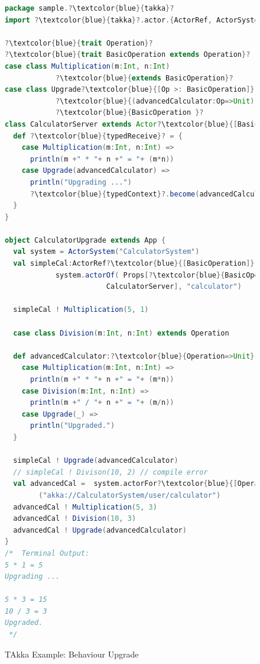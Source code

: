 \begin{figure}[!h]
\begin{lstlisting}[language=scala,  escapechar=?]
package sample.?\textcolor{blue}{takka}?
import ?\textcolor{blue}{takka}?.actor.{ActorRef, ActorSystem, Props, Actor}

?\textcolor{blue}{trait Operation}?
?\textcolor{blue}{trait BasicOperation extends Operation}?
case class Multiplication(m:Int, n:Int) 
			?\textcolor{blue}{extends BasicOperation}?
case class Upgrade?\textcolor{blue}{[Op >: BasicOperation]}?
			?\textcolor{blue}{(advancedCalculator:Op=>Unit) extends }?
			?\textcolor{blue}{BasicOperation }?
class CalculatorServer extends Actor?\textcolor{blue}{[BasicOperation]}? { 
  def ?\textcolor{blue}{typedReceive}? = {
    case Multiplication(m:Int, n:Int) => 
      println(m +" * "+ n +" = "+ (m*n))
    case Upgrade(advancedCalculator) =>
      println("Upgrading ...")
      ?\textcolor{blue}{typedContext}?.become(advancedCalculator)
  }
}

object CalculatorUpgrade extends App {
  val system = ActorSystem("CalculatorSystem") 
  val simpleCal:ActorRef?\textcolor{blue}{[BasicOperation]}? = 
  			system.actorOf( Props[?\textcolor{blue}{BasicOperation}?, 
						CalculatorServer], "calculator")
						
  simpleCal ! Multiplication(5, 1)
  
  case class Division(m:Int, n:Int) extends Operation
  
  def advancedCalculator:?\textcolor{blue}{Operation=>Unit}? = {
    case Multiplication(m:Int, n:Int) => 
      println(m +" * "+ n +" = "+ (m*n))
    case Division(m:Int, n:Int) => 
      println(m +" / "+ n +" = "+ (m/n))
    case Upgrade(_) =>
      println("Upgraded.")
  }
  
  simpleCal ! Upgrade(advancedCalculator)    
  // simpleCal ! Divison(10, 2) // compile error  
  val advancedCal =  system.actorFor?\textcolor{blue}{[Operation]}?
  		("akka://CalculatorSystem/user/calculator")   
  advancedCal ! Multiplication(5, 3)
  advancedCal ! Division(10, 3)
  advancedCal ! Upgrade(advancedCalculator)
}
/*  Terminal Output:
5 * 1 = 5
Upgrading ...

5 * 3 = 15
10 / 3 = 3
Upgraded.
 */
\end{lstlisting}
  \caption{TAkka Example: Behaviour Upgrade}
  \label{fig:takka_swap} 
  \vspace{-10pt }
\end{figure}


